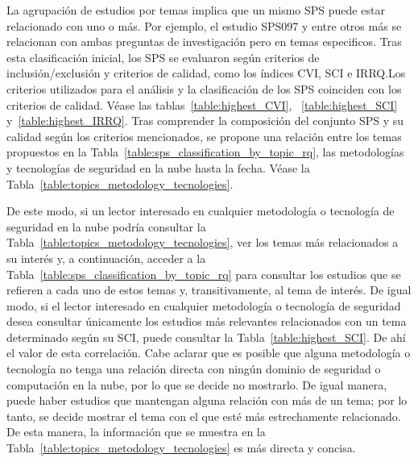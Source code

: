 La agrupación de estudios por temas implica que un mismo SPS puede estar relacionado con uno o más. Por ejemplo, el estudio 
SPS097 y entre otros más se relacionan con ambas preguntas de investigación pero en temas especificos. Tras esta clasificación inicial, 
los SPS se evaluaron según criterios de inclusión/exclusión y criterios de calidad, como los índices CVI, SCI e IRRQ.\@ Los criterios 
utilizados para el análisis y la clasificación de los SPS coinciden con los criterios de calidad. Véase las tablas~\ref{table:highest_CVI},
~\ref{table:highest_SCI} y~\ref{table:highest_IRRQ}. Tras comprender la composición del conjunto SPS y su calidad según los criterios 
mencionados, se propone una relación entre los temas propuestos en la Tabla~\ref{table:sps_classification_by_topic_rq}, 
las metodologías y tecnologías de seguridad en la nube hasta la fecha. Véase la Tabla~\ref{table:topics_metodology_tecnologies}.

De este modo, si un lector interesado en cualquier metodología o tecnología de seguridad en la nube podría consultar la 
Tabla~\ref{table:topics_metodology_tecnologies}, ver los temas más relacionados a su interés y, a continuación, acceder a la 
Tabla~\ref{table:sps_classification_by_topic_rq} para consultar los estudios que se refieren a cada uno de estos temas y, transitivamente, 
al tema de interés. De igual modo, si el lector interesado en cualquier metodología o tecnología de seguridad desea consultar únicamente 
los estudios más relevantes relacionados con un tema determinado según su SCI, puede consultar la Tabla~\ref{table:highest_SCI}. De ahí 
el valor de esta correlación. Cabe aclarar que es posible que alguna metodología o tecnología no tenga una relación directa con ningún 
dominio de seguridad o computación en la nube, por lo que se decide no mostrarlo. De igual manera, puede haber estudios que mantengan 
alguna relación con más de un tema; por lo tanto, se decide mostrar el tema con el que esté más estrechamente relacionado. De esta manera, 
la información que se muestra en la Tabla~\ref{table:topics_metodology_tecnologies} es más directa y concisa.


